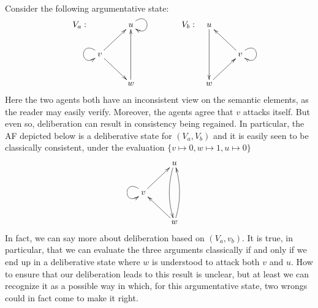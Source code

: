\documentclass[greybox]{svmult}
\begin{document}
\begin{example}\label{ex:wr}
Consider the following argumentative state:
$$
\begin{array}{llll}
V_a: & \xymatrix{ & u \ar@(ru,rd) \\ v \ar[ur] \ar[dr] \ar@(lu,ld) \\ & w \ar[uu] } & \hspace{1.5cm} V_b: & \xymatrix{ u \ar[dd] \\ & v \ar@(ru,rd) \ar[ul] \\ w \ar[ur] }
\end{array}
$$
Here the two agents both have an inconsistent view on the semantic elements, as the reader may easily verify. Moreover, the agents agree that $v$ attacks itself. But even so, deliberation can result in consistency being regained. In particular, the AF depicted below is a deliberative state for $(V_a,V_b)$ and it is easily seen to be classically consistent, under the evaluation $\{v \mapsto 0, w \mapsto 1, u \mapsto 0\}$
$$
\xymatrix{ & u \ar@/_/[dd] \\ v \ar@(lu,ld) \ar[ur] \\ & w \ar[ul] \ar@/_/[uu] }
$$
In fact, we can say more about deliberation based on $(V_a,v_b)$. It is true, in particular, that we can evaluate the three arguments classically if and only if we end up in a deliberative state where $w$ is understood to attack both $v$ and $u$. How to ensure that our deliberation leads to this result is unclear, but at least we can recognize it as a possible way in which, for this argumentative state, two wrongs could in fact come to make it right.


\end{example}
\end{document}
